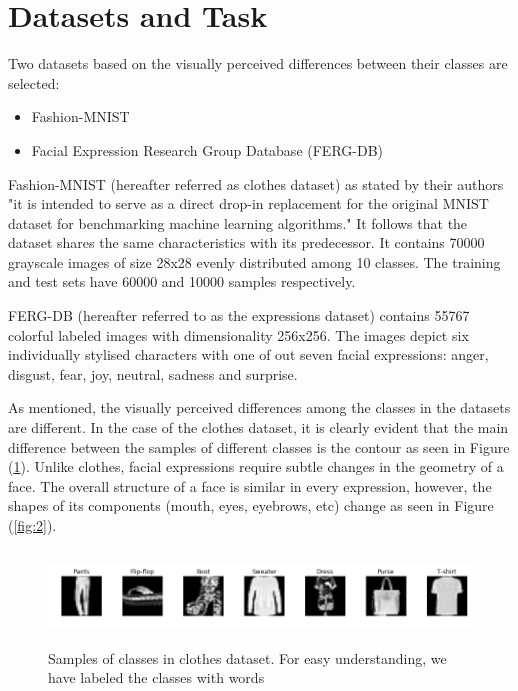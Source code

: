 \documentclass{article}
\begin{document}
\section{Datasets and Task}
\label{sec:data}

Two datasets based on the visually perceived differences between their classes are selected: 
\begin{itemize}
  \item Fashion-MNIST \citep{DBLP:journals/corr/abs-1708-07747}
  \item Facial Expression Research Group Database (FERG-DB)\citep{aneja2016modeling}
\end{itemize}

Fashion-MNIST (hereafter referred as clothes dataset) as stated by their authors "it is intended to serve as a direct drop-in replacement for the original MNIST dataset for benchmarking machine learning algorithms." It follows that the dataset shares the same characteristics with its predecessor. It contains 70000 grayscale images of size 28x28 evenly distributed among 10 classes. The training and test sets have 60000 and 10000 samples respectively.

FERG-DB (hereafter referred to as the expressions dataset) contains 55767 colorful labeled images with dimensionality 256x256. The images depict six individually stylised characters with one of out seven facial expressions: anger, disgust, fear, joy, neutral, sadness and surprise.

As mentioned, the visually perceived differences among the classes in the datasets are different. In the case of the clothes dataset, it is clearly evident that the main difference between the samples of different classes is the contour as seen in Figure (\ref{fig:1}). Unlike clothes, facial expressions require subtle changes in the geometry of a face. The overall structure of a face is similar in every expression, however, the shapes of its components (mouth, eyes, eyebrows, etc) change as seen in Figure (\ref{fig:2}).

\begin{figure}[tb]
    \vskip 5mm
        \begin{center}
            \includegraphics[width=\textwidth,height=2.5cm]{original_clothes}
            \caption{Samples of classes in clothes dataset. For easy understanding, we have labeled the classes with words}
            \label{fig:1}
        \end{center}
    \vskip -5mm
\end{figure}
\end{document}
